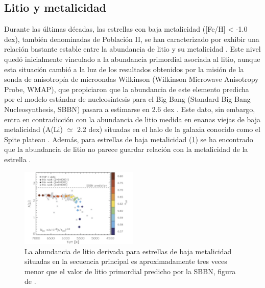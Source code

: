 \subsection{Litio y metalicidad}
Durante las últimas décadas, las estrellas con baja metalicidad ([Fe/H] < -1.0 dex), también denominadas de Población II, se han caracterizado por exhibir una relación bastante estable entre la abundancia de litio y su metalicidad \citep{Guiglion2016}. Este nivel quedó inicialmente vinculado a la abundancia primordial asociada al litio, aunque esta situación cambió a la luz de los resultados obtenidos por la misión de la sonda de anisotropía de microondas Wilkinson (Wilkinson Microwave Anisotropy Probe, WMAP), que propiciaron que la abundancia de este elemento predicha por el modelo estándar de nucleosíntesis para el Big Bang (Standard Big Bang Nucleosynthesis, SBBN) pasara a estimarse en 2.6 dex \citep{Spergel2003}. Este dato, sin embargo, entra en contradicción con la abundancia de litio medida en enanas viejas de baja metalicidad  (A(Li) $\simeq$ 2.2 dex) situadas en el halo de la galaxia conocido como el Spite plateau \citep{Spite1982}. Además, para estrellas de baja metalicidad (\ref{fig:li_abundances_sbbn}) se ha encontrado que la abundancia de litio no parece guardar relación con la metalicidad de la estrella \citep{Fu2015}.\par


\begin{figure}
	\centering
	\includegraphics[width=0.5\textwidth]{img/tesis/li_abundances_sbbn.pdf}
	\caption{La abundancia de litio derivada para estrellas de baja metalicidad situadas en la secuencia principal es aproximadamente tres veces menor que el valor de litio primordial predicho por la SBBN, figura de \cite{Fu2015}.}
	\label{fig:li_abundances_sbbn}
\end{figure}

